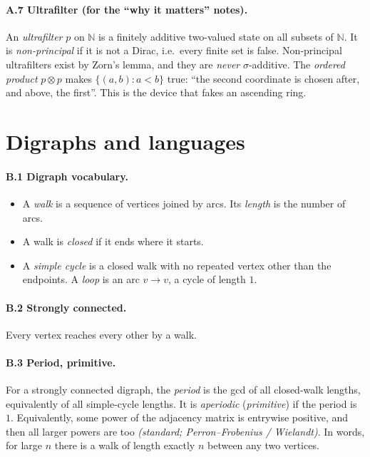 \documentclass[11pt]{article}
\theoremstyle{definition}
\theoremstyle{remark}
\newcommand{\bbN}{\mathbb{N}}
\begin{document}
\paragraph{A.7 Ultrafilter (for the ``why it matters'' notes).} An
\emph{ultrafilter} $p$ on $\bbN$ is a finitely additive two-valued state on all
subsets of $\bbN$. It is \emph{non-principal} if it is not a Dirac, i.e.\ every
finite set is false. Non-principal ultrafilters exist by Zorn's lemma, and they
are \emph{never} $\sigma$-additive. The \emph{ordered product} $p\otimes p$ makes
$\{(a,b): a<b\}$ true: ``the second coordinate is chosen after, and above, the
first''. This is the device that fakes an ascending ring.

\section{Digraphs and languages}

\paragraph{B.1 Digraph vocabulary.}
\begin{itemize}[nosep]
\item A \emph{walk} is a sequence of vertices joined by arcs. Its
  \emph{length} is the number of arcs.
\item A walk is \emph{closed} if it ends where it starts.
\item A \emph{simple cycle} is a closed walk with no repeated vertex other than
  the endpoints. A \emph{loop} is an arc $v\to v$, a cycle of length $1$.
\end{itemize}

\paragraph{B.2 Strongly connected.} Every vertex reaches every other by a walk.

\paragraph{B.3 Period, primitive.} For a strongly connected digraph, the
\emph{period} is the gcd of all closed-walk lengths, equivalently of all
simple-cycle lengths. It is \emph{aperiodic} (\emph{primitive}) if the period is
$1$. Equivalently, some power of the adjacency matrix is entrywise positive, and
then all larger powers are too \emph{(standard; Perron--Frobenius / Wielandt)}.
In words, for large $n$ there is a walk of length exactly $n$ between any two
vertices.
\end{document}
